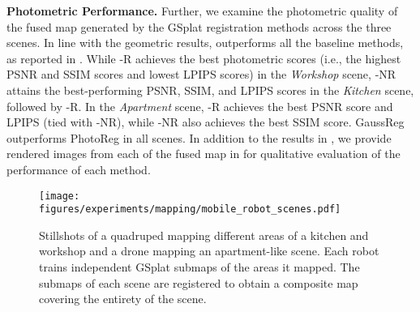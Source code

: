 \smallskip
\noindent\textbf{Photometric Performance.}
Further, we examine the photometric quality of the fused map generated by the GSplat registration methods across the three scenes. In line with the geometric results, \algname outperforms all the baseline methods, as reported in . While \algname-R achieves the best photometric scores (i.e., the highest PSNR and SSIM scores and lowest LPIPS scores) in the \emph{Workshop} scene, \algname-NR attains the best-performing PSNR, SSIM, and LPIPS scores in the \emph{Kitchen} scene, followed by \algname-R. In the \emph{Apartment} scene, \algname-R achieves the best PSNR score and LPIPS (tied with \algname-NR), while \algname-NR also achieves the best SSIM score. GaussReg outperforms PhotoReg in all scenes.
In addition to the results in , we provide rendered images from each of the fused map in  for qualitative evaluation of the performance of each method. 

\begin{figure*}[th]
    \centering
    \texttt{[image: figures/experiments/mapping/mobile\_robot\_scenes.pdf]}
    \caption{Stillshots of a quadruped mapping different areas of a kitchen and workshop and a drone mapping an apartment-like scene. Each robot trains independent GSplat submaps of the areas it mapped. The submaps of each scene are registered to obtain a composite map covering the entirety of the scene.}
    \label{fig:photometric_performance_mobile_robot_mapping}
\end{figure*}

